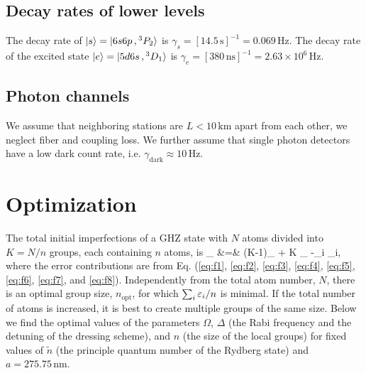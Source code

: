 \subsection{Decay rates of lower levels}
The decay rate of $| s \rangle =| 6s6p\,,{}^3P_2 \rangle$ is $\gamma_s = 
[14.5\,\mathrm{s}]^{-1} = 0.069\,\mathrm{Hz}$. The decay rate of the excited state
$| e \rangle = | 5d6s\,,{}^3D_1 \rangle$ is $\gamma_e  = [380\,\mathrm{ns}]^{-1} = 
2.63\times 10^6\,\mathrm{Hz}$.


\subsection{Photon channels}
We assume that neighboring stations are $L < 10\,\mathrm{km}$ apart from each
other, we neglect fiber and coupling loss. We further assume that single photon
detectors have a low dark count rate, i.e.
$\gamma_\mathrm{dark}\approx 10\,\mathrm{Hz}$.


\section{Optimization}
The total initial imperfections of a GHZ state with $N$ atoms divided into $K =
N/n$ groups, each containing $n$ atoms, is
\bal
	\eps_ &=& (K-1)\eps_
	+ K \eps_ \approx -\sum_i \eps_i,
\eal
where the error contributions are from Eq. (\ref{eq:f1}, \ref{eq:f2},
\ref{eq:f3}, \ref{eq:f4}, \ref{eq:f5}, \ref{eq:f6}, \ref{eq:f7},
 and \ref{eq:f8}). 
Independently from the total atom number, $N$, there is an optimal group size,
$n_\mathrm{opt}$, for which $\sum_i\varepsilon_i / n$ is minimal. If the total number of
atoms is increased, it is best to create multiple groups of the same size. Below
we find the optimal values of the parameters $\Omega$, $\Delta$ (the Rabi
frequency and the detuning of the dressing scheme), and $n$ (the size of the
local groups) for fixed values of $\tilde n$ (the principle quantum number of
the Rydberg state) and  $a = 275.75\,\mathrm{nm}$.

